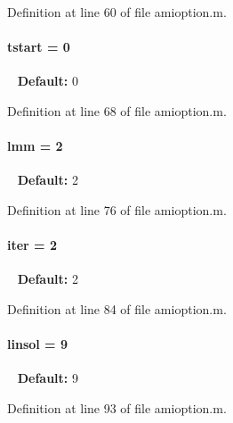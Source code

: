 Definition at line 60 of file amioption.\+m.

\hypertarget{classamioption_a18a69d8713604897ca9ee705d9d4fc4a}{}
\paragraph[{tstart}]{\setlength{\rightskip}{0pt plus 5cm}tstart = 0}\label{classamioption_a18a69d8713604897ca9ee705d9d4fc4a}
~\newline
{\bfseries Default\+:} 0 

Definition at line 68 of file amioption.\+m.

\hypertarget{classamioption_a6f4b21b13e0c8c531c452c70b43fc96a}{}
\paragraph[{lmm}]{\setlength{\rightskip}{0pt plus 5cm}lmm = 2}\label{classamioption_a6f4b21b13e0c8c531c452c70b43fc96a}
~\newline
{\bfseries Default\+:} 2 

Definition at line 76 of file amioption.\+m.

\hypertarget{classamioption_a1fc3ae6bd5c6a80e9b81b27fc7b7a11a}{}
\paragraph[{iter}]{\setlength{\rightskip}{0pt plus 5cm}iter = 2}\label{classamioption_a1fc3ae6bd5c6a80e9b81b27fc7b7a11a}
~\newline
{\bfseries Default\+:} 2 

Definition at line 84 of file amioption.\+m.

\hypertarget{classamioption_a06749b49eaa313f4d00f0115d3a7a7f3}{}
\paragraph[{linsol}]{\setlength{\rightskip}{0pt plus 5cm}linsol = 9}\label{classamioption_a06749b49eaa313f4d00f0115d3a7a7f3}
~\newline
{\bfseries Default\+:} 9 

Definition at line 93 of file amioption.\+m.

